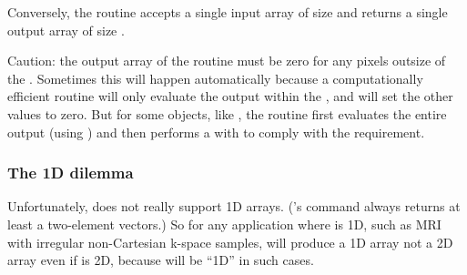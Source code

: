 \item
Conversely,
the  routine
accepts a single input array
of size 
and returns a single output array
of size .

\item
Caution:
the output array of the  routine
must be zero for any pixels
outsize of the .
%
Sometimes this will happen automatically
because a computationally efficient
 routine
will only evaluate the output
within the ,
and will set the other values to zero.
%
But for some objects,
like ,
the  routine
first evaluates the entire output
(using )
and then performs a  with 
to comply with the requirement.

\elist


\subsubsection{The 1D dilemma}

Unfortunately,
\matlab does not really support 1D arrays.
(\matlab's  command always returns 
at least a two-element vectors.)
So for any application where
 is 1D,
such as MRI with irregular non-Cartesian k-space samples,
will produce a 1D array
not a 2D array
even if  is 2D,
because  will be ``1D'' in such cases.
